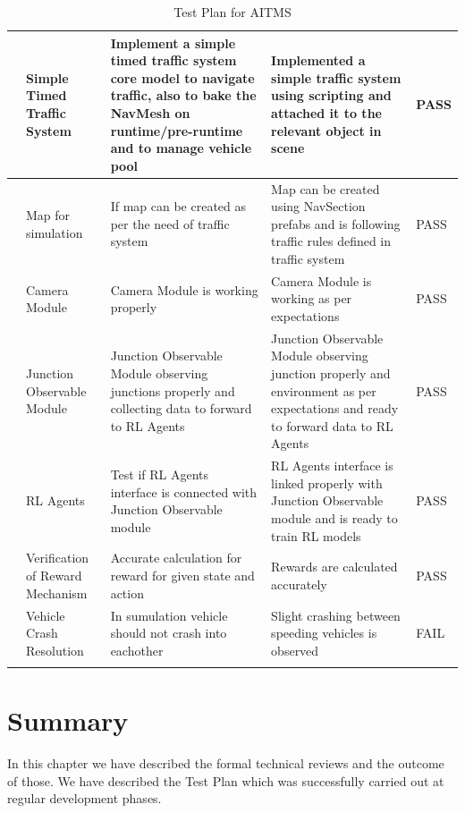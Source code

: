 \documentclass[openany,12pt]{report}
\begin{document}
\begin{longtable}{|p{0.6cm}|p{3.5cm}|p{5cm}|p{3.5cm}|p{1.7cm}|}
			\addtocounter{num}{1}
			\thenum&
			Simple Timed Traffic System&
			Implement a simple timed traffic system core model to navigate traffic, also to bake the NavMesh on runtime/pre-runtime and to manage vehicle pool&
			Implemented a simple traffic system using scripting and attached it to the relevant object in scene&
			PASS\\\hline
			
			\addtocounter{num}{1}
			\thenum&
			Map for simulation&
			If map can be created as per the need of traffic system&
			Map can be created using NavSection prefabs and is following traffic rules defined in traffic system&
			PASS\\\hline
			
			\addtocounter{num}{1}
			\thenum&
			Camera Module&
			Camera Module is working properly&
			Camera Module is working as per expectations&
			PASS\\\hline
			
			\addtocounter{num}{1}
			\thenum&
			Junction Observable Module&
			Junction Observable Module observing junctions properly and collecting data to forward to RL Agents&
			Junction Observable Module observing junction properly and environment as per expectations and ready to forward data to RL Agents&
			PASS\\\hline
			
			\addtocounter{num}{1}
			\thenum&
			RL Agents&
			Test if RL Agents interface is connected with Junction Observable module&
			RL Agents interface is linked properly with Junction Observable module and is ready to train RL models&
			PASS\\\hline
			
			\addtocounter{num}{1}
			\thenum&
			Verification of Reward Mechanism&
			Accurate calculation for reward for given state and action&
			Rewards are calculated accurately&
			PASS\\\hline
			
			\addtocounter{num}{1}
			\thenum&
			Vehicle Crash Resolution&
			In sumulation vehicle should not crash into eachother&
			Slight crashing between speeding vehicles is observed&
			FAIL\\\hline
			
						
			
			\caption{Test Plan for AITMS}
			\label{tab:nnwork}
		\end{longtable}
		
		\section{Summary}
		\hspace{0.5in}In this chapter we have described the formal technical reviews and the outcome of those. We have described the Test Plan which was successfully carried out at regular development phases.\\
		
\end{document}
